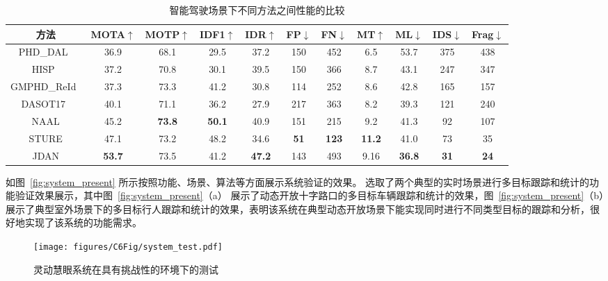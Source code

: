 \vspace{0.5em}
\renewcommand\arraystretch{1.5}
\begin{table}[htbp]\wuhao
	\centering
	\caption{智能驾驶场景下不同方法之间性能的比较}
	\vspace{0.3em}
	\begin{tabular}{c|cccccccccc}
		\hline
		方法   & MOTA$ \uparrow $ & MOTP$ \uparrow $  & IDF1$ \uparrow $  & IDR$ \uparrow $ & FP$ \downarrow $  & FN$ \downarrow $  & MT$ \uparrow $  & ML$ \downarrow $  & IDS$ \downarrow $  & Frag$ \downarrow $\\ 
		\hline
		PHD\_DAL~\cite{2019Online}    &36.9 &68.1 &29.5 &37.2 &150 &452 &6.5 &53.7 &375 &438\\
		HISP~\citep{baisa2021robust}   &37.2 &70.8 &30.1 &39.5 &150 &366 &8.7 &43.1 &247 &347\\
		GMPHD\_ReId~\citep{baisa2021occlusion}  &37.3 &73.3 &41.2 &30.8 &114 &252 &8.6 &42.8 &165 &157\\
		DASOT17~\citep{chu2020dasot}   &40.1 &71.1 &36.2 &27.9 &217 &363 &8.2 &39.3 &121 &240\\
		NAAL   &45.2 &\bfseries73.8 &\bfseries50.1 &40.9 &151 &215 &9.2 &41.3 &92 &107\\
		STURE     &47.1 &73.2 &48.2 &34.6 &\bfseries51 &\bfseries123 &\bfseries11.2 &41.0 &73 &35\\
		JDAN     &\bfseries53.7 &73.5 &41.2 &\bfseries47.2 &143 &493 &9.16 &\bfseries36.8  &\bfseries31 &\bfseries24\\
		\hline
	\end{tabular}
	\label{tab:quantitative_test}
\end{table}

如图~\ref{fig:system_present} 所示按照功能、场景、算法等方面展示系统验证的效果。
选取了两个典型的实时场景进行多目标跟踪和统计的功能验证效果展示，其中图~\ref{fig:system_present}（a） 展示了动态开放十字路口的多目标车辆跟踪和统计的效果，图~\ref{fig:system_present}（b）展示了典型室外场景下的多目标行人跟踪和统计的效果，表明该系统在典型动态开放场景下能实现同时进行不同类型目标的跟踪和分析，很好地实现了该系统的功能需求。


\vspace{0.5em}
\renewcommand\arraystretch{1.5}
\begin{figure*}[ht]
	\centering
	\texttt{[image: figures/C6Fig/system\_test.pdf]}
	\caption{灵动慧眼系统在具有挑战性的环境下的测试}
	\label{fig:system_test}
\end{figure*}

